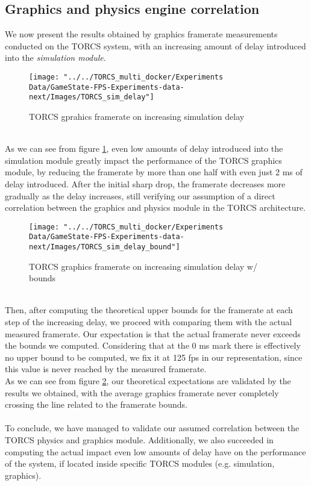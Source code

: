 \subsection{Graphics and physics engine correlation}\label{graphics-physics-experiment}
We now present the results obtained by graphics framerate measurements conducted on the TORCS system, with an increasing amount of delay introduced into the \textit{simulation module}.
\begin{figure}[h!]
	\centering
	\texttt{[image: "../../TORCS\_multi\_docker/Experiments Data/GameState-FPS-Experiments-data-next/Images/TORCS\_sim\_delay"]}
	\caption[TORCS graphics framerate on increasing simulation delay]{TORCS gprahics framerate on increasing simulation delay}
	\label{fig:torcs-sim-delay}
\end{figure}
\\ As we can see from figure \ref{fig:torcs-sim-delay}, even low amounts of delay introduced into the simulation module greatly impact the performance of the TORCS graphics module, by reducing the framerate by more than one half with even just 2 ms of delay introduced. After the initial sharp drop, the framerate decreases more gradually as the delay increases, still verifying our assumption of a direct correlation between the graphics and physics module in the TORCS architecture.
\begin{figure}[h!]
	\centering
	\texttt{[image: "../../TORCS\_multi\_docker/Experiments Data/GameState-FPS-Experiments-data-next/Images/TORCS\_sim\_delay\_bound"]}
	\caption[TORCS graphics framerate on increasing simulation delay w/ bounds]{TORCS graphics framerate on increasing simulation delay w/ bounds}
	\label{fig:torcs-sim-delay-bound}
\end{figure}
\\ Then, after computing the theoretical upper bounds for the framerate at each step of the increasing delay, we proceed with comparing them with the actual measured framerate. Our expectation is that the actual framerate never exceeds the bounds we computed. Considering that at the 0 ms mark there is effectively no upper bound to be computed, we fix it at 125 fps in our representation, since this value is never reached by the measured framerate. \\
As we can see from figure \ref{fig:torcs-sim-delay-bound}, our theoretical expectations are validated by the results we obtained, with the average graphics framerate never completely crossing the line related to the framerate bounds. \\ \\
To conclude, we have managed to validate our assumed correlation between the TORCS physics and graphics module. Additionally, we also succeeded in computing the actual impact even low amounts of delay have on the performance of the system, if located inside specific TORCS modules (e.g. simulation, graphics).

